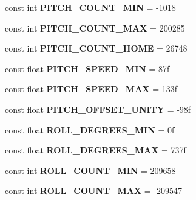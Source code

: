\begin{DoxyCompactItemize}
const int {\bfseries P\+I\+T\+C\+H\+\_\+\+C\+O\+U\+N\+T\+\_\+\+M\+IN} = -\/1018
\item 
\mbox{\label{class_scorbot_e_r_i_x_a108c08642b2dccbd48e7c5585c65726c}} 
const int {\bfseries P\+I\+T\+C\+H\+\_\+\+C\+O\+U\+N\+T\+\_\+\+M\+AX} = 200285
\item 
\mbox{\label{class_scorbot_e_r_i_x_adee0034426113ad105bbda04aa5da409}} 
const int {\bfseries P\+I\+T\+C\+H\+\_\+\+C\+O\+U\+N\+T\+\_\+\+H\+O\+ME} = 26748
\item 
\mbox{\label{class_scorbot_e_r_i_x_a270f6ad77571bd64655e0bb6329792fe}} 
const float {\bfseries P\+I\+T\+C\+H\+\_\+\+S\+P\+E\+E\+D\+\_\+\+M\+IN} = 87f
\item 
\mbox{\label{class_scorbot_e_r_i_x_a5ca94c84b6cd6544a714c421b3aba5fb}} 
const float {\bfseries P\+I\+T\+C\+H\+\_\+\+S\+P\+E\+E\+D\+\_\+\+M\+AX} = 133f
\item 
\mbox{\label{class_scorbot_e_r_i_x_af2e1067edc54fb44ca8bffb5cf03ca72}} 
const float {\bfseries P\+I\+T\+C\+H\+\_\+\+O\+F\+F\+S\+E\+T\+\_\+\+U\+N\+I\+TY} = -\/98f
\item 
\mbox{\label{class_scorbot_e_r_i_x_accf0e376abade49acc20a535de2f1c8f}} 
const float {\bfseries R\+O\+L\+L\+\_\+\+D\+E\+G\+R\+E\+E\+S\+\_\+\+M\+IN} = 0f
\item 
\mbox{\label{class_scorbot_e_r_i_x_a57eb1a952954a936ef9c3c9032762078}} 
const float {\bfseries R\+O\+L\+L\+\_\+\+D\+E\+G\+R\+E\+E\+S\+\_\+\+M\+AX} = 737f
\item 
\mbox{\label{class_scorbot_e_r_i_x_aa8eafd3a427f306fceaa8a251f46ca8f}} 
const int {\bfseries R\+O\+L\+L\+\_\+\+C\+O\+U\+N\+T\+\_\+\+M\+IN} = 209658
\item 
\mbox{\label{class_scorbot_e_r_i_x_a2e0e51d09505d42702c453484ee4b87e}} 
const int {\bfseries R\+O\+L\+L\+\_\+\+C\+O\+U\+N\+T\+\_\+\+M\+AX} = -\/209547
\item 
\mbox{\label{class_scorbot_e_r_i_x_a409cfc91d430fcfd55de2436cd6e2358}} 

\end{DoxyCompactItemize}
